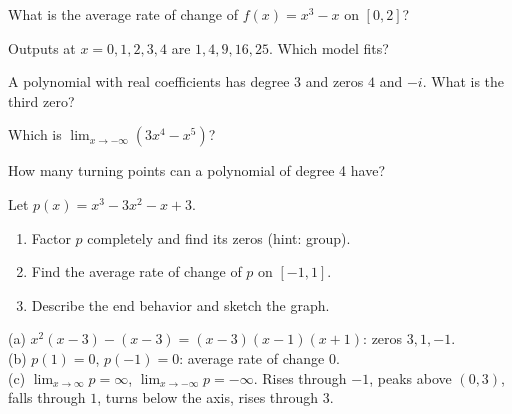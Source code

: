 \begin{exo}[1.2]{}
What is the average rate of change of $f(x)=x^3-x$ on $[0,2]$?
\end{exo}
\begin{exo}[1.3]{}
Outputs at $x=0,1,2,3,4$ are $1,4,9,16,25$. Which model fits?
\end{exo}
\begin{exo}[1.5]{}
A polynomial with real coefficients has degree 3 and zeros $4$ and $-i$. What is the third zero?
\end{exo}
\begin{exo}[1.6]{}
Which is $\displaystyle\lim_{x\to-\infty}\left(3x^4-x^5\right)$?
\end{exo}
\begin{exo}[1.4]{}
How many turning points can a polynomial of degree 4 have?
\end{exo}
\begin{exo}{}
Let $p(x)=x^3-3x^2-x+3$.
\begin{enumerate}[label=(\alph*)]
\item Factor $p$ completely and find its zeros (hint: group).
\item Find the average rate of change of $p$ on $[-1,1]$.
\item Describe the end behavior and sketch the graph.
\end{enumerate}
\begin{solution}
(a) $x^2(x-3)-(x-3)=(x-3)(x-1)(x+1)$: zeros $3,1,-1$.\\
(b) $p(1)=0$, $p(-1)=0$: average rate of change $0$.\\
(c) $\lim_{x\to\infty}p=\infty$, $\lim_{x\to-\infty}p=-\infty$. Rises through $-1$, peaks above $(0,3)$, falls through $1$, turns below the axis, rises through $3$.
\end{solution}
\end{exo}

